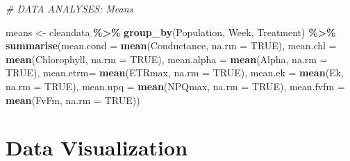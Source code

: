 \documentclass[
]{article}
\newenvironment{Shaded}{\begin{snugshade}}{\end{snugshade}}
\newcommand{\AttributeTok}[1]{\textcolor[rgb]{0.13,0.29,0.53}{#1}}
\newcommand{\CommentTok}[1]{\textcolor[rgb]{0.56,0.35,0.01}{\textit{#1}}}
\newcommand{\ConstantTok}[1]{\textcolor[rgb]{0.56,0.35,0.01}{#1}}
\newcommand{\FunctionTok}[1]{\textcolor[rgb]{0.13,0.29,0.53}{\textbf{#1}}}
\newcommand{\NormalTok}[1]{#1}
\newcommand{\OtherTok}[1]{\textcolor[rgb]{0.56,0.35,0.01}{#1}}
\newcommand{\SpecialCharTok}[1]{\textcolor[rgb]{0.81,0.36,0.00}{\textbf{#1}}}
\begin{document}
\begin{Shaded}
\begin{Highlighting}[]
\CommentTok{\# DATA ANALYSES: Means}

\NormalTok{means }\OtherTok{\textless{}{-}}\NormalTok{ cleandata }\SpecialCharTok{\%\textgreater{}\%} 
  \FunctionTok{group\_by}\NormalTok{(Population, Week, Treatment) }\SpecialCharTok{\%\textgreater{}\%} 
  \FunctionTok{summarise}\NormalTok{(}\AttributeTok{mean.cond =} \FunctionTok{mean}\NormalTok{(Conductance, }\AttributeTok{na.rm =} \ConstantTok{TRUE}\NormalTok{), }
            \AttributeTok{mean.chl =} \FunctionTok{mean}\NormalTok{(Chlorophyll, }\AttributeTok{na.rm =} \ConstantTok{TRUE}\NormalTok{), }
            \AttributeTok{mean.alpha =} \FunctionTok{mean}\NormalTok{(Alpha, }\AttributeTok{na.rm =} \ConstantTok{TRUE}\NormalTok{), }
            \AttributeTok{mean.etrm=} \FunctionTok{mean}\NormalTok{(ETRmax, }\AttributeTok{na.rm =} \ConstantTok{TRUE}\NormalTok{), }
            \AttributeTok{mean.ek =} \FunctionTok{mean}\NormalTok{(Ek, }\AttributeTok{na.rm =} \ConstantTok{TRUE}\NormalTok{), }
            \AttributeTok{mean.npq =} \FunctionTok{mean}\NormalTok{(NPQmax, }\AttributeTok{na.rm =} \ConstantTok{TRUE}\NormalTok{), }
            \AttributeTok{mean.fvfm =} \FunctionTok{mean}\NormalTok{(FvFm, }\AttributeTok{na.rm =} \ConstantTok{TRUE}\NormalTok{))}
\end{Highlighting}
\end{Shaded}

\section{Data Visualization}\label{data-visualization}
\end{document}
